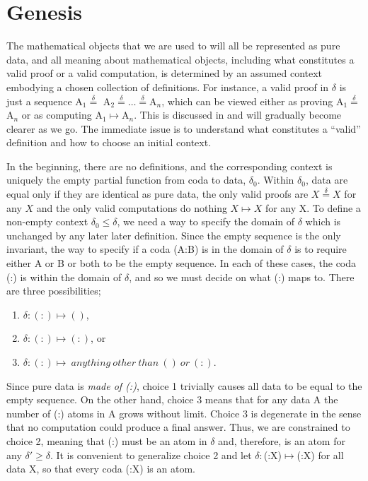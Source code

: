 \documentclass[11pt]{article}
\begin{document}
\section{Genesis}

    The mathematical objects that we are used to will all be represented as pure data, and all meaning about mathematical objects, including what constitutes a valid proof or a valid computation, is determined by an assumed context embodying a chosen collection of definitions.  For instance, a valid proof in $\delta$ is just a sequence 
A$_1{\overset \delta =}$ A$_2 {\overset \delta =} \dots {\overset \delta =} $A$_n$, 
 which can be viewed either as proving A$_1{\overset \delta =}$A$_n$ or as computing A$_1\mapsto$A$_n$.
This is discussed in \cite{PDF} and will gradually become clearer as we go.  The immediate issue is to understand what constitutes a ``valid'' definition and how to choose an initial context.     
    
     In the beginning, there are no definitions, and the corresponding context is uniquely the empty partial function from coda to data, $\delta_0$.
 Within $\delta_0$, data are equal only if they are identical as 
 pure data, the only valid proofs are $X{\overset \delta =}X$ for any $X$ and the only valid computations do nothing $X\mapsto X$ for any X. 
To define a non-empty context $\delta_0\le\delta$, we need a way to specify the domain of $\delta$ which is unchanged by any later  
later definition.  Since the empty sequence is the only invariant, the way to specify if a coda (A:B) is in the domain of $\delta$ is 
to require either A or B or both to be the empty sequence. In each of these cases, the coda (:) is within the domain of $\delta$, and so we must decide on what (:) maps to.  
There are three possibilities; 
\begin{enumerate}
\item{$\delta: (:) \mapsto ()$},
\item{$\delta: (:) \mapsto (:)$}, or 
\item{$\delta: (:) \mapsto \ anything\ other\ than\ ()\ or\ (:)$}. 
\end{enumerate}
Since pure data is {\it made of (:)}, choice 1 trivially causes all data to be equal to the empty sequence. On the other hand, choice 3 means that for any data A the number of (:) atoms in A grows without limit.  Choice 3 is degenerate in the sense that no computation could produce a final answer.  Thus, we are constrained to choice 2, meaning that (:) must be an atom in $\delta$ and, therefore, is an atom for any $\delta'\ge\delta$.  
It is convenient to generalize choice 2 and let $\delta:$(:X)$\mapsto$(:X) for all data X, so that every coda (:X) is an atom.
\end{document}
